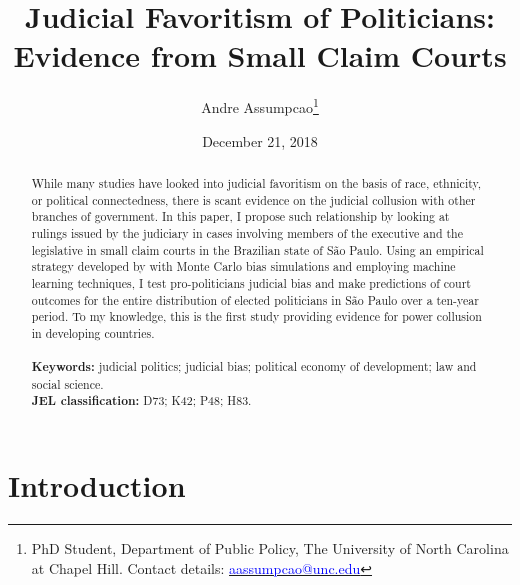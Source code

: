 \documentclass[11pt]{article}
\begin{document}
\begin{titlepage}
\title{Judicial Favoritism of Politicians: Evidence from Small Claim Courts}
\author{Andre Assumpcao\thanks{PhD Student, Department of Public Policy, The University of North Carolina at Chapel Hill. Contact details: \href{mailto:aassumpcao@unc.edu}{\textcolor{blue}{aassumpcao@unc.edu}}}}
\date{December 21, 2018}

\maketitle

\begin{abstract}
\noindent While many studies have looked into judicial favoritism on the basis of race, ethnicity, or political connectedness, there is scant evidence on the judicial collusion with other branches of government. In this paper, I propose such relationship by looking at rulings issued by the judiciary in cases involving members of the executive and the legislative in small claim courts in the Brazilian state of São Paulo. Using an empirical strategy developed by \citet{AbramsJudgesVaryTheir2012} with Monte Carlo bias simulations and employing machine learning techniques, I test pro-politicians judicial bias and make predictions of court outcomes for the entire distribution of elected politicians in São Paulo over a ten-year period. To my knowledge, this is the first study providing evidence for power collusion in developing countries. \\
\vspace{0in} \\
\noindent\textbf{Keywords:} judicial politics; judicial bias; political economy of development; law and social science. \\

\noindent\textbf{JEL classification:} D73; K42; P48; H83. \\

\vspace{0in}
\bigskip

\end{abstract}

\setcounter{page}{0}

\thispagestyle{empty}

\end{titlepage}

\clearpage

\section{Introduction} \label{sec:introduction_paper2}
\end{document}
